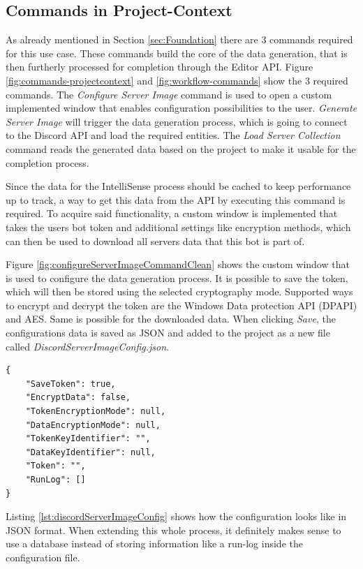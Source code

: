 \newpage
\subsection{Commands in Project-Context}
\label{ssec:VSCommands}
As already mentioned in Section \ref{sec:Foundation} there are 3 commands required for this use case. These commands build the core of the data generation, that is then furtherly processed for completion through the Editor API.
Figure \ref{fig:commands-projectcontext} and \ref{fig:workflow-commands} show the 3 required commands. The \textit{Configure Server Image} command is used to open a custom implemented window that enables configuration possibilities to the user. \textit{Generate Server Image} will trigger the data generation process, which is going to connect to the Discord API and load the required entities. The \textit{Load Server Collection} command reads the generated data based on the project to make it usable for the completion process.

Since the data for the IntelliSense process should be cached to keep performance up to track, a way to get this data from the API by executing this command is required. To acquire said functionality, a custom window is implemented that takes the users bot token and additional settings like encryption methods, which can then be used to download all servers data that this bot is part of. 

Figure \ref{fig:configureServerImageCommandClean} shows the custom window that is used to configure the data generation process. It is possible to save the token, which will then be stored using the selected cryptography mode. Supported ways to encrypt and decrypt the token are the Windows Data protection API (DPAPI) and AES. Same is possible for the downloaded data.  When clicking \textit{Save}, the configurations data is saved as JSON and added to the project as a new file called \textit{DiscordServerImageConfig.json}. 

\begin{lstlisting}[caption={DiscordServerImageConfig.json}, label={lst:discordServerImageConfig}]
{
	"SaveToken": true,
	"EncryptData": false,
	"TokenEncryptionMode": null,
	"DataEncryptionMode": null,
	"TokenKeyIdentifier": "",
	"DataKeyIdentifier": null,
	"Token": "",
	"RunLog": []
}	
\end{lstlisting}
Listing \ref{lst:discordServerImageConfig} shows how the configuration looks like in JSON format. When extending this whole process, it definitely makes sense to use a database instead of storing information like a run-log inside the configuration file. 

